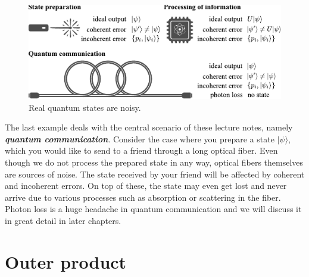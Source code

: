 \begin{figure}[t]
    \centering
    \includegraphics[width=\textwidth]{lesson3/3-1_noise.pdf}
    \caption[Noisy world]{Real quantum states are noisy.}
    \label{fig:3-1_noise}
\end{figure}

The last example deals with the central scenario of these lecture notes, namely \textbf{\emph{quantum communication}}.
Consider the case where you prepare a state $|\psi\rangle$, which you would like to send to a friend through a long optical fiber.
Even though we do not process the prepared state in any way, optical fibers themselves are sources of noise.
The state received by your friend will be affected by coherent and incoherent errors.
On top of these, the state may even get lost and never arrive due to various processes such as absorption or scattering in the fiber.
Photon loss is a huge headache in quantum communication and we will discuss it in great detail in later chapters.





\section{Outer product}
\label{sec:3-2_outer_product}

